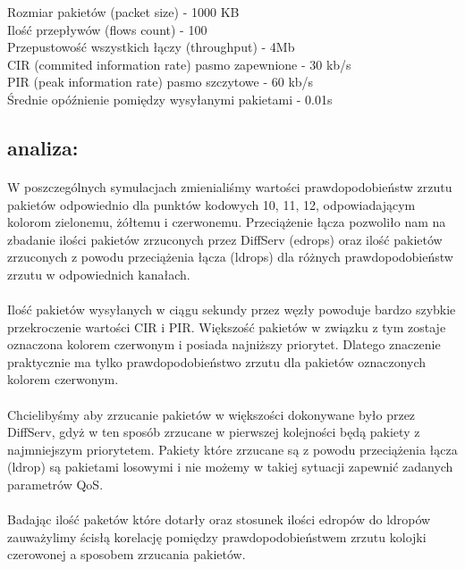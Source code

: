 \documentclass[a4paper]{article}
\begin{document}
Rozmiar pakietów (packet size) - 1000 KB\\
Ilość przepływów (flows count) - 100\\
Przepustowość wszystkich łączy (throughput) - 4Mb\\
CIR (commited information rate) pasmo zapewnione - 30 kb/s\\
PIR (peak information rate) pasmo szczytowe - 60 kb/s\\
Średnie opóźnienie pomiędzy wysyłanymi pakietami - 0.01s\\

\subsection{analiza:}

\paragraph{}
W poszczególnych symulacjach zmienialiśmy wartości prawdopodobieństw zrzutu pakietów odpowiednio dla punktów kodowych 10, 11, 12, odpowiadającym kolorom zielonemu, żółtemu i czerwonemu.
Przeciążenie łącza pozwoliło nam na zbadanie ilości pakietów zrzuconych przez DiffServ (edrops) oraz ilość pakietów zrzuconych z powodu przeciążenia łącza (ldrops) dla różnych prawdopodobieństw zrzutu w odpowiednich kanałach.

\paragraph{}
Ilość pakietów wysyłanych w ciągu sekundy przez węzły powoduje bardzo szybkie przekroczenie wartości CIR i PIR. Większość pakietów w związku z tym zostaje oznaczona kolorem czerwonym i posiada najniższy priorytet. Dlatego znaczenie praktycznie ma tylko prawdopodobieństwo zrzutu dla pakietów oznaczonych kolorem czerwonym. 

\paragraph{}
Chcielibyśmy aby zrzucanie pakietów w większości dokonywane było przez DiffServ, gdyż w ten sposób zrzucane w pierwszej kolejności będą pakiety z najmniejszym priorytetem. Pakiety które zrzucane są z powodu przeciążenia łącza (ldrop) są pakietami losowymi i nie możemy w takiej sytuacji zapewnić zadanych parametrów QoS.

\paragraph{}
Badając ilość paketów które dotarły oraz stosunek ilości edropów do ldropów zauważylimy ścisłą korelację pomiędzy prawdopodobieństwem zrzutu kolojki czerowonej a sposobem zrzucania pakietów.
\end{document}
